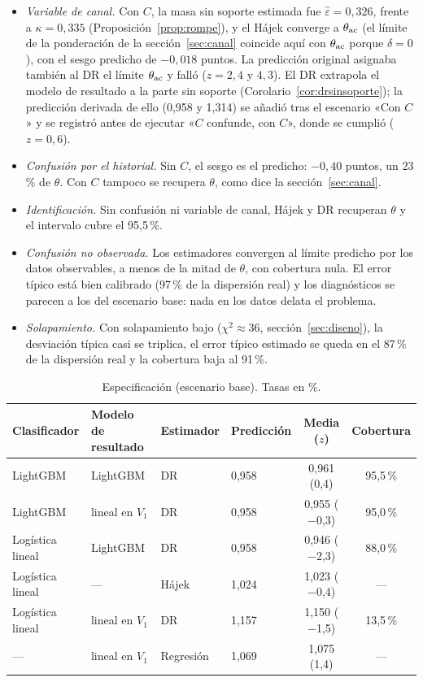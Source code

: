 \begin{itemize}
  \item \emph{Variable de canal.} Con $C$, la masa sin soporte estimada fue $\hat\varepsilon=0,326$, frente a $\kappa=0,335$ (Proposición~\ref{prop:rompe}), y el Hájek converge a $\theta_{\mathrm{ac}}$ (el límite de la ponderación de la sección~\ref{sec:canal} coincide aquí con $\theta_{\mathrm{ac}}$ porque $\delta=0$), con el sesgo predicho de $-0,018$ puntos. La predicción original asignaba también al DR el límite $\theta_{\mathrm{ac}}$ y falló ($z=2,4$ y $4,3$). El DR extrapola el modelo de resultado a la parte sin soporte (Corolario~\ref{cor:drsinsoporte}); la predicción derivada de ello (0,958 y 1,314) se añadió tras el escenario «Con $C$» y se registró antes de ejecutar «$C$ confunde, con $C$», donde se cumplió ($z=0,6$).
  \item \emph{Confusión por el historial.} Sin $C$, el sesgo es el predicho: $-0,40$ puntos, un 23\,\% de $\theta$. Con $C$ tampoco se recupera $\theta$, como dice la sección~\ref{sec:canal}.
  \item \emph{Identificación.} Sin confusión ni variable de canal, Hájek y DR recuperan $\theta$ y el intervalo cubre el 95,5\,\%.
  \item \emph{Confusión no observada.} Los estimadores convergen al límite predicho por los datos observables, a menos de la mitad de $\theta$, con cobertura nula. El error típico está bien calibrado (97\,\% de la dispersión real) y los diagnósticos se parecen a los del escenario base: nada en los datos delata el problema.
  \item \emph{Solapamiento.} Con solapamiento bajo ($\chi^2\approx36$, sección~\ref{sec:diseno}), la desviación típica casi se triplica, el error típico estimado se queda en el 87\,\% de la dispersión real y la cobertura baja al 91\,\%.
\end{itemize}

\begin{table}[ht]
\centering\small
\caption{Especificación (escenario base). Tasas en \%.}\label{tab:especificacion}
\begin{tabular}{@{}llllcc@{}}
\toprule
Clasificador & Modelo de resultado & Estimador & Predicción & Media ($z$) & Cobertura \\
\midrule
LightGBM & LightGBM & DR & 0,958 & 0,961 (0,4) & 95,5\,\% \\
LightGBM & lineal en $V_1$ & DR & 0,958 & 0,955 ($-$0,3) & 95,0\,\% \\
Logística lineal & LightGBM & DR & 0,958 & 0,946 ($-$2,3) & 88,0\,\% \\
Logística lineal & --- & Hájek & 1,024 & 1,023 ($-$0,4) & --- \\
Logística lineal & lineal en $V_1$ & DR & 1,157 & 1,150 ($-$1,5) & 13,5\,\% \\
--- & lineal en $V_1$ & Regresión & 1,069 & 1,075 (1,4) & --- \\
\bottomrule
\end{tabular}
\end{table}

